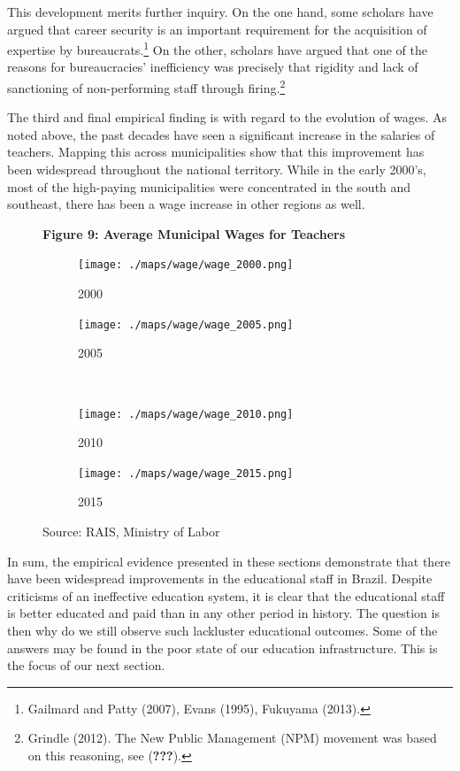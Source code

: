 \documentclass[12pt,]{article}
\let\rmarkdownfootnote\footnote%
\def\footnote{\protect\rmarkdownfootnote}
\begin{document}
This development merits further inquiry. On the one hand, some scholars
have argued that career security is an important requirement for the
acquisition of expertise by bureaucrats.\footnote{Gailmard and Patty
  (2007), Evans (1995), Fukuyama (2013).} On the other, scholars have
argued that one of the reasons for bureaucracies' inefficiency was
precisely that rigidity and lack of sanctioning of non-performing staff
through firing.\footnote{Grindle (2012). The New Public Management (NPM)
  movement was based on this reasoning, see ({\textbf{???}}).}

The third and final empirical finding is with regard to the evolution of
wages. As noted above, the past decades have seen a significant increase
in the salaries of teachers. Mapping this across municipalities show
that this improvement has been widespread throughout the national
territory. While in the early 2000's, most of the high-paying
municipalities were concentrated in the south and southeast, there has
been a wage increase in other regions as well.

\begin{figure}
    \centering
    \textbf{Figure 9: Average Municipal Wages for Teachers}
    \begin{subfigure}{0.4\textwidth}
        \centering 
        \texttt{[image: ./maps/wage/wage\_2000.png]}
        \caption{2000}
    \end{subfigure} %
    \begin{subfigure}{0.4\textwidth}
        \centering
        \texttt{[image: ./maps/wage/wage\_2005.png]}
        \caption{2005}
    \end{subfigure} \\
    \begin{subfigure}{0.4\textwidth}
        \centering
        \texttt{[image: ./maps/wage/wage\_2010.png]}
        \caption{2010}
    \end{subfigure} %
    \begin{subfigure}{0.4\textwidth}
        \centering
        \texttt{[image: ./maps/wage/wage\_2015.png]}
        \caption{2015}
    \end{subfigure}
    \caption*{\footnotesize \hfill Source: RAIS, Ministry of Labor}
\end{figure}

In sum, the empirical evidence presented in these sections demonstrate
that there have been widespread improvements in the educational staff in
Brazil. Despite criticisms of an ineffective education system, it is
clear that the educational staff is better educated and paid than in any
other period in history. The question is then why do we still observe
such lackluster educational outcomes. Some of the answers may be found
in the poor state of our education infrastructure. This is the focus of
our next section.
\end{document}

